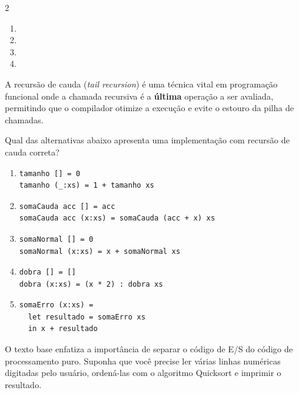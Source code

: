 \documentclass[a4paper,10pt,brazil]{article}
\begin{document}
\begin{multicols}{2}
\begin{enumerate}
  \item {}
  \item {}

  \item {}

  \item {}


\end{enumerate}

A recursão de cauda (\emph{tail recursion}) é uma técnica vital em programação funcional onde a chamada recursiva é a \textbf{última} operação a ser avaliada, permitindo que o compilador otimize a execução e evite o estouro da pilha de chamadas. 

Qual das alternativas abaixo apresenta uma implementação com recursão de cauda correta?

\begin{enumerate}
  \item \begin{verbatim}
tamanho [] = 0
tamanho (_:xs) = 1 + tamanho xs
\end{verbatim}

  \item \begin{verbatim}
somaCauda acc [] = acc
somaCauda acc (x:xs) = somaCauda (acc + x) xs
\end{verbatim}

  \item \begin{verbatim}
somaNormal [] = 0
somaNormal (x:xs) = x + somaNormal xs
\end{verbatim}

  \item \begin{verbatim}
dobra [] = []
dobra (x:xs) = (x * 2) : dobra xs
\end{verbatim}

  \item \begin{verbatim}
somaErro (x:xs) = 
  let resultado = somaErro xs 
  in x + resultado
\end{verbatim}


\end{enumerate}

O texto base enfatiza a importância de separar o código de E/S do código de processamento puro. Suponha que você precise ler várias linhas numéricas digitadas pelo usuário, ordená-las com o algoritmo Quicksort e imprimir o resultado. 


\end{multicols}
\end{document}
